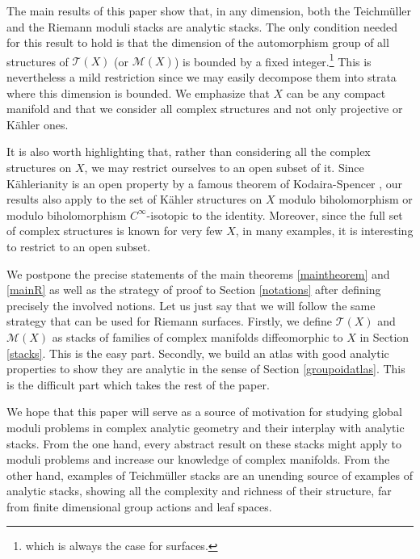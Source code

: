 \documentclass[10pt]{amsart}
\let\mathcal\mathscr
\theoremstyle{plain}
\theoremstyle{definition}
\theoremstyle{remark}
\numberwithin{equation}{section}
\begin{document}
The main results of this paper show that, in any dimension, both the Teichmüller and the Riemann moduli stacks are analytic stacks. The only condition needed for this result to hold is that the dimension of the automorphism group of all structures of $\mathcal T(X)$ (or $\mathcal M(X)$) is bounded by a fixed integer.\footnote{which is always the case for surfaces.} This is nevertheless a mild restriction since we may easily decompose them into strata where this dimension is bounded. We emphasize that $X$ can be any compact manifold and that we consider all complex structures and not only projective or Kähler ones.

It is also worth highlighting that, rather than considering all the complex structures on $X$, we may restrict ourselves to an open subset of it. Since Kählerianity is an open property by a famous theorem of Kodaira-Spencer \cite[Th.\,4.6]{MK}, our results also apply to the set of Kähler structures on $X$ modulo biholomorphism or modulo biholomorphism $C^\infty$-isotopic to the identity. Moreover, since the full set of complex structures is known for very few $X$, in many examples, it is interesting to restrict to an open subset.

We postpone the precise statements of the main theorems \ref{maintheorem} and \ref{mainR} as well as the strategy of proof to Section \ref{notations} after defining precisely the involved notions. Let us just say that we will follow the same strategy that can be used for Riemann surfaces. Firstly, we define $\mathcal T(X)$ and $\mathcal M(X)$ as stacks of families of complex manifolds diffeomorphic to $X$ in Section \ref{stacks}. This is the easy part. Secondly, we build an atlas with good analytic properties to show they are analytic in the sense of Section \ref{groupoidatlas}. This is the difficult part which takes the rest of the paper.

We hope that this paper will serve as a source of motivation for studying global moduli problems in complex analytic geometry and their interplay with analytic stacks. From the one hand, every abstract result on these stacks might apply to moduli problems and increase our knowledge of complex manifolds. From the other hand, examples of Teichmüller stacks are an unending source of examples of analytic stacks, showing all the complexity and richness of their structure, far from finite dimensional group actions and leaf spaces.
\end{document}
